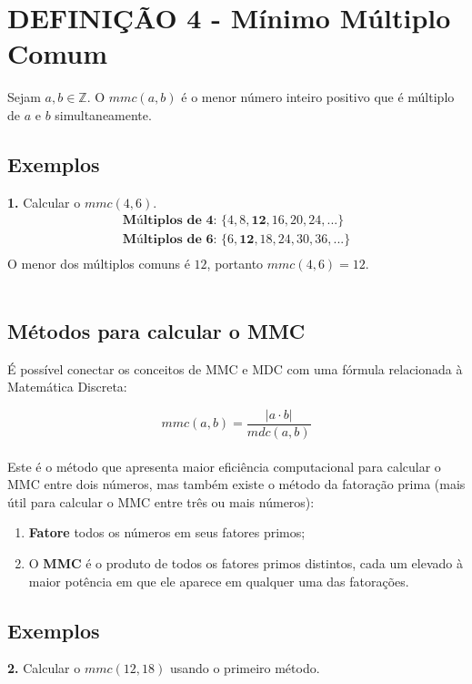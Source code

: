\section*{DEFINIÇÃO 4 - Mínimo Múltiplo Comum}
Sejam $a, b \in \mathbb{Z}$. O $mmc(a,b)$ é o menor número inteiro positivo que é múltiplo de $a$ e $b$ simultaneamente.

\subsection*{Exemplos}
\textbf{1.} Calcular o $mmc(4,6)$.
\begin{align*}
    \textbf{Múltiplos de 4: } \{4,8,\mathbf{12},16,20,24,...\}  \\
    \textbf{Múltiplos de 6: } \{6,\mathbf{12},18,24,30,36,...\} \\
\end{align*}
O menor dos múltiplos comuns é $12$, portanto $mmc(4,6) = 12$.\\
\vspace{-10pt}\\

\subsection*{Métodos para calcular o MMC}
É possível conectar os conceitos de MMC e MDC com uma fórmula relacionada à Matemática Discreta:

\[
    mmc(a,b) = \frac{|a \cdot b|}{mdc(a,b)}
\]
\\
Este é o método que apresenta maior eficiência computacional para calcular o MMC entre dois números, mas também existe o método da fatoração prima (mais útil para calcular o MMC entre três ou mais números):

\begin{enumerate}
    \item \textbf{Fatore} todos os números em seus fatores primos;
    \item O \textbf{MMC} é o produto de todos os fatores primos distintos, cada um elevado à maior potência em que ele aparece em qualquer uma das fatorações.
\end{enumerate}

\subsection*{Exemplos}
\textbf{2.} Calcular o $mmc(12,18)$ usando o primeiro método.

